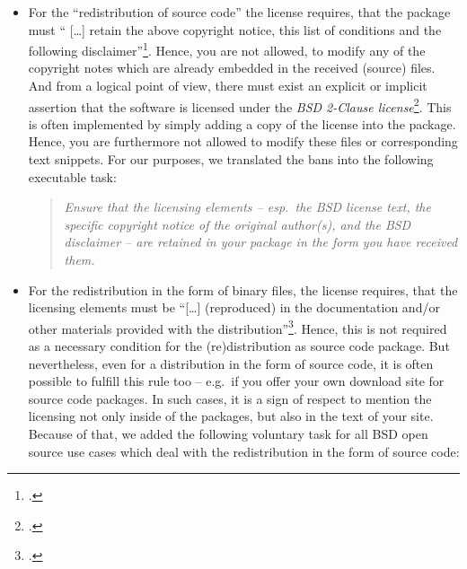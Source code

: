 \begin{itemize}
\item For the \enquote{redistribution of source code} the license requires,
that the package must \enquote{ [\ldots] retain the above copyright notice, this
list of conditions and the following disclaimer}\footcite[cf.][\nopage
wp]{BsdLicense2Clause}. Hence, you are not allowed, to modify any of the
copyright notes which are already embedded in the received (source) files. And
from a logical point of view, there must exist an explicit or implicit
assertion that the software is licensed under the \textit{BSD 2-Clause
license}\footcite[The BSD license requires that a re-distributed software
package must contain the (package specific) copyright notice, the (license
specific) conditions and the BSD disclaimer. (cf.][\nopage wp) You might ask
what you should do, if these elements are missed in the package you received. If so,
the package you received had not been licensed adequately. Hence, you do not know
reliably whether you have received it under a BSD license. In other words: If
you have received a BSD licensed software package, it must contain sufficient
license fulfilling elements, or it is not a BSD licensed
software]{BsdLicense2Clause}. This is often implemented by simply adding a copy
of the license into the package. Hence, you are furthermore not allowed to
modify these files or corresponding text snippets. For our purposes, we
translated the bans into the following executable task:

\begin{quote}\textit{Ensure that the licensing elements -- esp.\ the BSD license
text, the specific copyright notice of the original author(s), and the BSD
disclaimer -- are retained in your package in the form you have received
them.}\end{quote}

\item For the redistribution in the form of binary files, the license requires, that
the licensing elements must be \enquote{[\ldots] (reproduced) in the
documentation and/or other materials provided with the
distribution}\footcite[cf.][\nopage wp]{BsdLicense2Clause}. Hence, this is not
required as a necessary condition for the (re)distribution as source code
package. But nevertheless, even for a distribution in the form of source code, it is
often possible to fulfill this rule too -- e.g.\ if you offer your own download
site for source code packages. In such cases, it is a sign of respect to
mention the licensing not only inside of the packages, but also in the text of
your site. Because of that, we added the following voluntary task for all BSD
open source use cases which deal with the redistribution in the form of source code:


\end{itemize}
